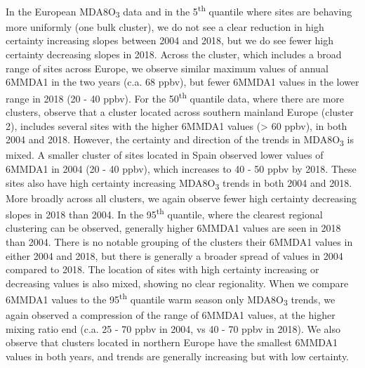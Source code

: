 \documentclass[journal abbreviation, manuscript]{copernicus}
\begin{document}
In the European MDA8O\textsubscript{3} data and in the 5\textsuperscript{th} quantile where sites are behaving more uniformly (one bulk cluster), we do not see a clear reduction in high certainty increasing slopes between 2004 and 2018, but we do see fewer high certainty decreasing slopes in 2018. Across the cluster, which includes a broad range of sites across Europe, we observe similar maximum values of annual 6MMDA1 in the two years (c.a. 68 ppbv), but fewer 6MMDA1 values in the lower range in 2018 (20 - 40 ppbv). For the 50\textsuperscript{th} quantile data, where there are more clusters, observe that a cluster located across southern mainland Europe (cluster 2), includes several sites with the higher 6MMDA1 values (> 60 ppbv), in both 2004 and 2018. However, the certainty and direction of the trends in MDA8O\textsubscript{3} is mixed. A smaller cluster of sites located in Spain observed lower values of 6MMDA1 in 2004 (20 - 40 ppbv), which increases to 40 - 50 ppbv by 2018. These sites also have high certainty increasing MDA8O\textsubscript{3} trends in both 2004 and 2018. More broadly across all clusters, we again observe fewer high certainty decreasing slopes in 2018 than 2004. In the 95\textsuperscript{th} quantile, where the clearest regional clustering can be observed, generally higher 6MMDA1 values are seen in 2018 than 2004. There is no notable grouping of the clusters their 6MMDA1 values in either 2004 and 2018, but there is generally a broader spread of values in 2004 compared to 2018. The location of sites with high certainty increasing or decreasing values is also mixed, showing no clear regionality. When we compare 6MMDA1 values to the 95\textsuperscript{th} quantile warm season only MDA8O\textsubscript{3} trends, we again observed a compression of the range of 6MMDA1 values, at the higher mixing ratio end (c.a. 25 - 70 ppbv in 2004, vs 40 - 70 ppbv in 2018). We also observe that clusters located in northern Europe have the smallest 6MMDA1 values in both years, and trends are generally increasing but with low certainty.
\end{document}
